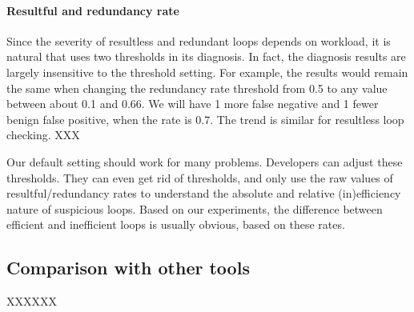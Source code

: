 \paragraph{Resultful and redundancy rate}
Since the severity of resultless and redundant loops depends on
workload, it is natural that \Tool uses two thresholds in its diagnosis.
In fact, the diagnosis results are largely insensitive to the threshold
setting. For example, the results would remain the same when
changing the redundancy rate threshold from 0.5 to any value between about
0.1 and 0.66. We will have 1 more false negative and 1 fewer benign false positive, 
when the rate is 0.7. The trend is similar for resultless
loop checking. 
XXX

Our default setting %
should work for many problems.
Developers can adjust these thresholds. 
They can even get rid of thresholds, and only
use the raw values of resultful/redundancy rates to understand
the absolute and relative (in)efficiency nature of suspicious 
loops. Based on our experiments, the difference between efficient and inefficient
loops is usually obvious, based on these rates.

\subsection{Comparison with other tools}
XXXXXX
